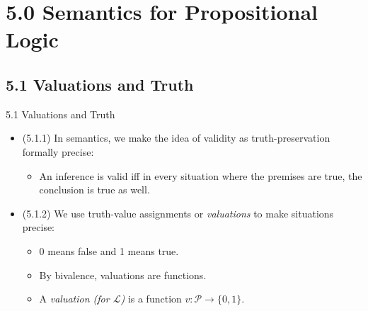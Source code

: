 \section{5.0 Semantics for Propositional Logic}
\subsection{5.1 Valuations and Truth}

\begin{frame}{5.1 Valuations and Truth}

	\begin{itemize}
	
		\item (5.1.1) In semantics, we make the idea of validity as truth-preservation formally precise:
		
		\begin{itemize}
		
			\item An inference is valid iff in every situation where the premises are true, the conclusion is true as well.
		
		\end{itemize}
		
		
		\item (5.1.2) We use truth-value assignments or \emph{valuations} to make situations precise:
		
		\begin{itemize}		
		
			\item 0 means false and 1 means true.
			
			\item By bivalence, valuations are functions.
									
			\item A \emph{valuation (for $\mathcal{L}$)} is a function $v:\mathcal{P}\to\{0,1\}$. 
			
		\end{itemize}
		
	\end{itemize}

\end{frame}

